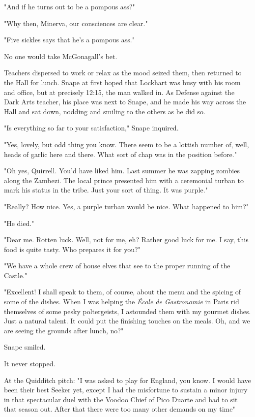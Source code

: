 "And if he turns out to be a pompous ass?"

"Why then, Minerva, our consciences are clear."

"Five sickles says that he's a pompous ass."

No one would take McGonagall's bet.

Teachers dispersed to work or relax as the mood seized them, then returned to the Hall for lunch. Snape at first hoped that Lockhart was busy with his room and office, but at precisely 12:15, the man walked in. As Defense against the Dark Arts teacher, his place was next to Snape, and he made his way across the Hall and sat down, nodding and smiling to the others as he did so.

"Is everything so far to your satisfaction," Snape inquired.

"Yes, lovely, but odd thing you know. There seem to be a lottish number of, well, heads of garlic here and there. What sort of chap was in the position before."

"Oh yes, Quirrell. You'd have liked him. Last summer he was zapping zombies along the Zambezi. The local prince presented him with a ceremonial turban to mark his status in the tribe. Just your sort of thing. It was purple."

"Really? How nice. Yes, a purple turban would be nice. What happened to him?"

"He died."

"Dear me. Rotten luck. Well, not for me, eh? Rather good luck for me. I say, this food is quite tasty. Who prepares it for you?"

"We have a whole crew of house elves that see to the proper running of the Castle."

"Excellent! I shall speak to them, of course, about the menu and the spicing of some of the dishes. When I was helping the \emph{École de Gastronomie} in Paris rid themselves of some pesky poltergeists, I astounded them with my gourmet dishes. Just a natural talent. It could put the finishing touches on the meals. Oh, and we are seeing the grounds after lunch, no?"

Snape smiled.

It never stopped.

At the Quidditch pitch: "I was asked to play for England, you know. I would have been their best Seeker yet, except I had the misfortune to sustain a minor injury in that spectacular duel with the Voodoo Chief of Pico Duarte and had to sit that season out. After that there were too many other demands on my time{\el}"

